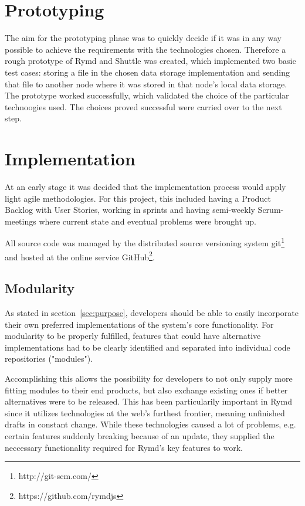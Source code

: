 \section{Prototyping}

The aim for the prototyping phase was to quickly decide if it was in any way possible to achieve the requirements with the technologies chosen. Therefore a rough prototype of Rymd and Shuttle was created, which implemented two basic test cases: storing a file in the chosen data storage implementation and sending that file to another node where it was stored in that node's local data storage. The prototype worked successfully, which validated the choice of  the particular technoogies used. The choices proved successful were carried over to the next step.

\section{Implementation}

At an early stage it was decided that the implementation process would apply light agile methodologies. For this project, this included having a Product Backlog with User Stories, working in sprints and having semi-weekly Scrum-meetings where current state and eventual problems were brought up.

All source code was managed by the distributed source versioning system git\footnote{http://git-scm.com/} and hosted at the online service GitHub\footnote{https://github.com/rymdjs}.

\subsection{Modularity}
\label{sec:modularity}

As stated in section~\ref{sec:purpose}, developers should be able to easily incorporate their own preferred implementations of the system's core functionality. For modularity to be properly fulfilled, features that could have alternative implementations had to be clearly identified and separated into individual code repositories ("modules").

Accomplishing this allows the possibility for developers to not only supply more fitting modules to their end products, but also exchange existing ones if better alternatives were to be released. This has been particularily important in Rymd since it utilizes technologies at the web's furthest frontier, meaning unfinished drafts in constant change. While these technologies caused a lot of problems, e.g. certain features suddenly breaking because of an update, they supplied the neccessary functionality required for Rymd's key features to work.
